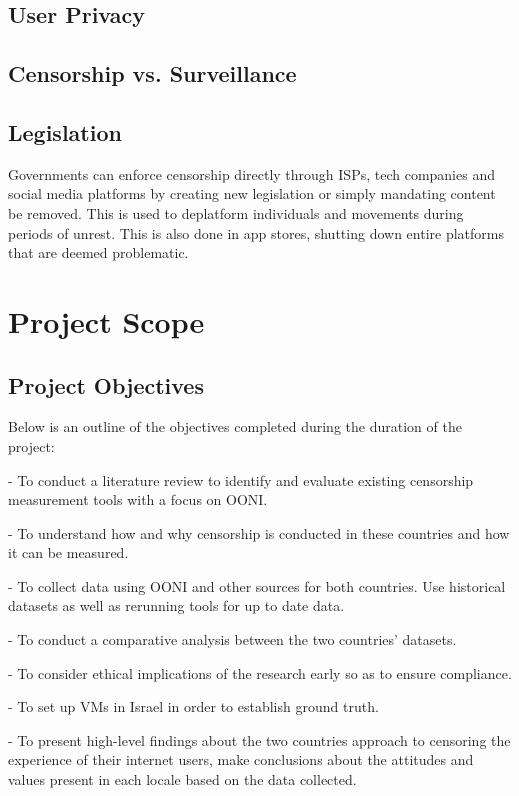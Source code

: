 \subsection{User Privacy}
\subsection{Censorship vs. Surveillance}
\subsection{Legislation}
Governments can enforce censorship directly through ISPs, tech companies and social media 
platforms by creating new legislation or simply mandating content be removed. This is used to 
deplatform individuals and movements during periods of unrest. This is also done in app stores, 
shutting down entire platforms that are deemed problematic. 



\section{Project Scope}
\subsection{Project Objectives}
Below is an outline of the objectives completed during the duration of the project:

-   To conduct a literature review to identify and evaluate existing censorship measurement 
tools with a focus on OONI. 

-   To understand how and why censorship is conducted in these countries and how it can be 
measured. 

-   To collect data using OONI and other sources for both countries. Use historical datasets 
as well as rerunning tools for up to date data. 

-   To conduct a comparative analysis between the two countries’ datasets. 

-   To consider ethical implications of the research early so as to ensure compliance. 

-   To set up VMs in Israel in order to establish ground truth. 

-   To present high-level findings about the two countries approach to censoring the 
experience of their internet users, make conclusions about the attitudes and values 
present in each locale based on the data collected. 

